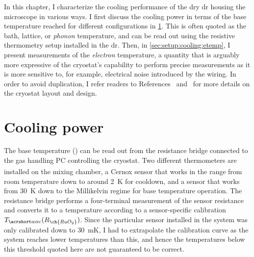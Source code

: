 In this chapter, I characterize the cooling performance of the dry \gls{dr} housing the microscope in various ways.
I first discuss the cooling power in terms of the base temperature \Tmxc reached for different configurations in \cref{sec:setup:cooling:power}.
This is often quoted as the bath, lattice, or \emph{phonon} temperature,
and can be read out using the resistive  thermometry setup installed in the \gls{dr}.
Then, in \cref{sec:setup:cooling:etemp}, I present measurements of the \emph{electron} temperature, a quantity that is arguably more expressive of the cryostat's capability to perform precise measurements as it is more sensitive to, for example, electrical noise introduced by the wiring.
In order to avoid duplication, I refer readers to References~\cite[Section~4.1]{Descamps2021} and~\cite[Section~II]{Descamps2024} for more details on the cryostat layout and design.

\section{Cooling power}\label{sec:setup:cooling:power}
The base temperature (\Tmxc) can be read out from the resistance bridge connected to the gas handling PC controlling the cryostat.
Two different thermometers are installed on the mixing chamber, a Cernox\textsuperscript{\textregistered} sensor that works in the range from room temperature down to around \qty{2}{\kelvin} for cooldown, and a  sensor that works from \qty{30}{\kelvin} down to the Millikelvin regime for base temperature operation.
The resistance bridge performs a four-terminal measurement of the sensor resistance and converts it to a temperature according to a sensor-specific calibration $\Tmxc(R_{\ch{RuO_2}})$.
Since the particular sensor installed in the system was only calibrated down to \qty{30}{\milli\kelvin}, I had to extrapolate the calibration curve as the system reaches lower temperatures than this, and hence the temperatures below this threshold quoted here are not guaranteed to be correct.

